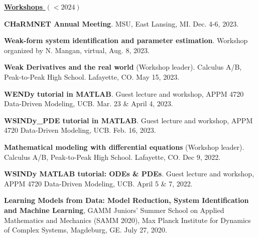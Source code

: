 \documentclass[letterpaper,11pt,oneside]{article}
\newcommand{\headr}[1]{\uline{\Large{\textbf{#1}} \hfill } \\ \vspace{-0.5cm}}
\begin{document}
\headr{Workshops $(<2024)$}
\vspace{-0.5cm}
\begin{enumerate}[label={[\arabic*]}]
\item \textbf{CHaRMNET Annual Meeting}. MSU, East Lansing, MI. Dec. 4-6, 2023.
\item \textbf{Weak-form system identification and parameter estimation}. Workshop organized by N. Mangan, virtual, Aug. 8, 2023.
\item \textbf{Weak Derivatives and the real world} (Workshop leader). Calculus A/B, Peak-to-Peak High School. Lafayette, CO. May 15, 2023.
\item \textbf{WENDy tutorial in MATLAB}. Guest lecture and workshop, APPM 4720 Data-Driven Modeling, UCB. Mar. 23 \& April 4, 2023.
\item \textbf{WSINDy\_PDE tutorial in MATLAB}. Guest lecture and workshop, APPM 4720 Data-Driven Modeling, UCB. Feb. 16, 2023.
\item \textbf{Mathematical modeling with differential equations} (Workshop leader). 
Calculus A/B, Peak-to-Peak High School. Lafayette, CO. Dec 9, 2022.
\item \textbf{WSINDy MATLAB tutorial: ODEs \& PDEs}. Guest lecture and workshop, APPM 4720 Data-Driven Modeling, UCB. April 5 \& 7, 2022.
\item \textbf{Learning Models from Data: Model Reduction, System Identification and Machine Learning}, GAMM Juniors' Summer School on Applied Mathematics and Mechanics (SAMM 2020), Max Planck Institute for Dynamics of Complex Systems, Magdeburg, GE. July 27, 2020.
\end{enumerate}
\end{document}
